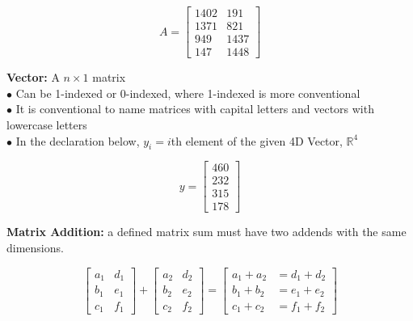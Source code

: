 \documentclass{article}
\begin{document}
        \begin{equation*}
            A = \begin{bmatrix}
                    1402 & 191 \\
                    1371 & 821 \\
                    949  & 1437 \\
                    147  & 1448
                \end{bmatrix}
        \end{equation*}

        \noindent \textbf{Vector:} A $n\times1$ matrix \\
        $\bullet$ Can be 1-indexed or 0-indexed, where 1-indexed is more conventional \\
        $\bullet$ It is conventional to name matrices with capital letters and vectors with lowercase letters \\
        $\bullet$ In the declaration below, $y_i=i$th element of the given 4D Vector, $\mathbb{R}^4$

        \begin{equation*}
            y = \begin{bmatrix}
                    460 \\
                    232 \\
                    315 \\
                    178
                \end{bmatrix}
        \end{equation*}

        \noindent \textbf{Matrix Addition:} a defined matrix sum must have two addends with the same dimensions.

        \begin{equation*}
            \begin{bmatrix}
                a_1 & d_1 \\
                b_1 & e_1 \\
                c_1 & f_1
            \end{bmatrix}
            +
            \begin{bmatrix}
                a_2 & d_2 \\
                b_2 & e_2 \\
                c_2 & f_2
            \end{bmatrix}
            =
            \begin{bmatrix}
                a_1 + a_2   &= d_1 + d_2 \\
                b_1 + b_2   &= e_1 + e_2 \\
                c_1 + c_2   &= f_1 + f_2
            \end{bmatrix}
        \end{equation*}
\end{document}
